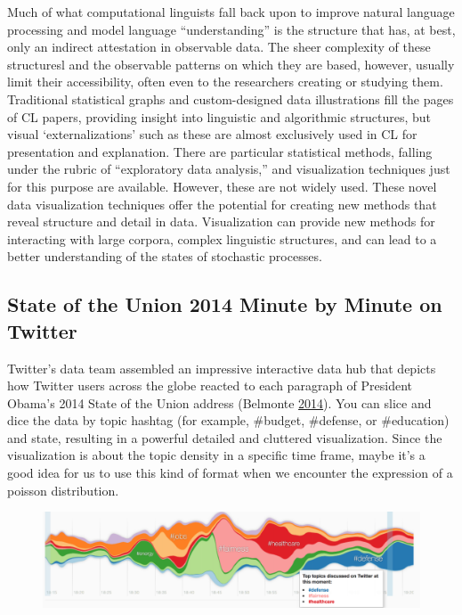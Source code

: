 \documentclass[]{book}
\begin{document}
Much of what computational linguists fall back upon to improve natural
language processing and model language ``understanding'' is the
structure that has, at best, only an indirect attestation in observable
data. The sheer complexity of these structuresl and the observable
patterns on which they are based, however, usually limit their
accessibility, often even to the researchers creating or studying them.
Traditional statistical graphs and custom-designed data illustrations
fill the pages of CL papers, providing insight into linguistic and
algorithmic structures, but visual `externalizations' such as these are
almost exclusively used in CL for presentation and explanation. There
are particular statistical methods, falling under the rubric of
``exploratory data analysis,'' and visualization techniques just for
this purpose are available. However, these are not widely used. These
novel data visualization techniques offer the potential for creating new
methods that reveal structure and detail in data. Visualization can
provide new methods for interacting with large corpora, complex
linguistic structures, and can lead to a better understanding of the
states of stochastic processes.

\subsection{State of the Union 2014 Minute by Minute on
Twitter}\label{state-of-the-union-2014-minute-by-minute-on-twitter}

Twitter's data team assembled an impressive interactive data hub that
depicts how Twitter users across the globe reacted to each paragraph of
President Obama's 2014 State of the Union address (Belmonte
\protect\hyperlink{ref-SotU2014}{2014}). You can slice and dice the data
by topic hashtag (for example, \#budget, \#defense, or \#education) and
state, resulting in a powerful detailed and cluttered visualization.
Since the visualization is about the topic density in a specific time
frame, maybe it's a good idea for us to use this kind of format when we
encounter the expression of a poisson distribution.

\begin{figure}
\centering
\includegraphics{images/SotU2014.png}
\caption{}
\end{figure}
\end{document}
